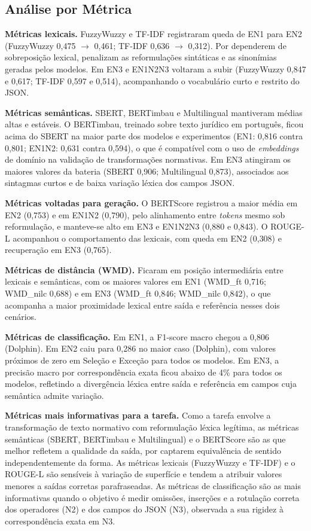 \subsection{Análise por Métrica}

\textbf{Métricas lexicais.} FuzzyWuzzy e TF-IDF registraram queda de EN1 para EN2 (FuzzyWuzzy 0{,}475 $\rightarrow$ 0{,}461; TF-IDF 0{,}636 $\rightarrow$ 0{,}312). Por dependerem de sobreposição lexical, penalizam as reformulações sintáticas e as sinonímias geradas pelos modelos. Em EN3 e EN1N2N3 voltaram a subir (FuzzyWuzzy 0{,}847 e 0{,}617; TF-IDF 0{,}597 e 0{,}514), acompanhando o vocabulário curto e restrito do JSON.

\textbf{Métricas semânticas.} SBERT, BERTimbau e Multilingual mantiveram médias altas e estáveis. O BERTimbau, treinado sobre texto jurídico em português, ficou acima do SBERT na maior parte dos modelos e experimentos (EN1: 0{,}816 contra 0{,}801; EN1N2: 0{,}631 contra 0{,}594), o que é compatível com o uso de \textit{embeddings} de domínio na validação de transformações normativas. Em EN3 atingiram os maiores valores da bateria (SBERT 0{,}906; Multilingual 0{,}873), associados aos sintagmas curtos e de baixa variação léxica dos campos JSON.

\textbf{Métricas voltadas para geração.} O BERTScore registrou a maior média em EN2 (0{,}753) e em EN1N2 (0{,}790), pelo alinhamento entre \textit{tokens} mesmo sob reformulação, e manteve-se alto em EN3 e EN1N2N3 (0{,}880 e 0{,}843). O ROUGE-L acompanhou o comportamento das lexicais, com queda em EN2 (0{,}308) e recuperação em EN3 (0{,}765).

\textbf{Métricas de distância (WMD).} Ficaram em posição intermediária entre lexicais e semânticas, com os maiores valores em EN1 (WMD\_ft 0{,}716; WMD\_nilc 0{,}688) e em EN3 (WMD\_ft 0{,}846; WMD\_nilc 0{,}842), o que acompanha a maior proximidade lexical entre saída e referência nesses dois cenários.

\textbf{Métricas de classificação.} Em EN1, a F1-score macro chegou a 0{,}806 (Dolphin). Em EN2 caiu para 0{,}286 no maior caso (Dolphin), com valores próximos de zero em Seleção e Exceção para todos os modelos. Em EN3, a precisão macro por correspondência exata ficou abaixo de 4\% para todos os modelos, refletindo a divergência léxica entre saída e referência em campos cuja semântica admite variação.

\textbf{Métricas mais informativas para a tarefa.} Como a tarefa envolve a transformação de texto normativo com reformulação léxica legítima, as métricas semânticas (SBERT, BERTimbau e Multilingual) e o BERTScore são as que melhor refletem a qualidade da saída, por captarem equivalência de sentido independentemente da forma. As métricas lexicais (FuzzyWuzzy e TF-IDF) e o ROUGE-L são sensíveis à variação de superfície e tendem a atribuir valores menores a saídas corretas parafraseadas. As métricas de classificação são as mais informativas quando o objetivo é medir omissões, inserções e a rotulação correta dos operadores (N2) e dos campos do JSON (N3), observada a sua rigidez à correspondência exata em N3.

